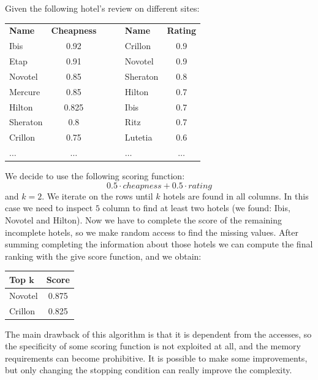 \begin{example}
    Given the following hotel's review on different sites: 
    \begin{table}[H]
        \centering
        \begin{tabular}{|lc|c|lc|}
        \cline{1-2} \cline{4-5}
        \textbf{Name} & \textbf{Cheapness} & $\:\:\:\:\:\:$ & \textbf{Name} & \textbf{Rating} \\ \cline{1-2} \cline{4-5} 
        Ibis          & 0.92               &                & Crillon       & 0.9             \\ 
        Etap          & 0.91               &                & Novotel       & 0.9             \\  
        Novotel       & 0.85               &                & Sheraton      & 0.8             \\  
        Mercure       & 0.85               &                & Hilton        & 0.7             \\  
        Hilton        & 0.825              &                & Ibis          & 0.7             \\  
        Sheraton      & 0.8                &                & Ritz          & 0.7             \\  
        Crillon       & 0.75               &                & Lutetia       & 0.6             \\  
        $\dots$       & $\dots$            &                & $\dots$       & $\dots$         \\ \cline{1-2} \cline{4-5} 
        \end{tabular}
    \end{table}
    We decide to use the following scoring function: 
    \[0.5 \cdot cheapness+0.5 \cdot rating\]
    and $k=2$. We iterate on the rows until $k$ hotels are found in all columns. In this case we need to inspect $5$ column to find at
    least two hotels (we found: Ibis, Novotel and Hilton). Now we have to complete the score of the remaining incomplete hotels, so we make 
    random access to find the missing values. After summing completing the information about those hotels we can compute the final ranking 
    with the give score function, and we obtain: 
    \begin{table}[H]
        \centering
        \begin{tabular}{|lc|}
        \hline
        \textbf{Top $\boldsymbol{k}$} & \textbf{Score} \\ \hline
        Novotel                       & 0.875          \\ 
        Crillon                       & 0.825          \\ \hline
        \end{tabular}
    \end{table}
\end{example}
The main drawback of this algorithm is that it is dependent from the accesses, so the specificity of some scoring function is not exploited
at all, and the memory requirements can become prohibitive. It is possible to make 
some improvements, but only changing the stopping condition can really improve the complexity. 

